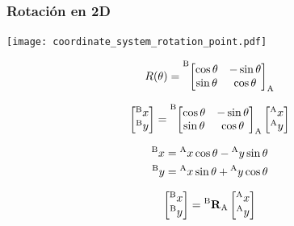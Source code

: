 \begin{frame}
    \frametitle{Rotación en 2D}

    \begin{center}
        \begin{minipage}{0.4\linewidth}
            \texttt{[image: coordinate\_system\_rotation\_point.pdf]}
        \end{minipage}
        \hspace{1em}
        \begin{minipage}{0.5\linewidth}
            \begin{equation*}
                R(\theta) =
                \toCoord{\fromCoord{\begin{bmatrix}
                    \cos \theta & -\sin \theta \\
                    \sin \theta & \cos \theta
                \end{bmatrix}}{A}}{B}
            \end{equation*}

            \begin{equation*}
                \begin{bmatrix}
                    \toCoord{x}{B}\\
                    \toCoord{y}{B}
                \end{bmatrix} =
                \toCoord{\fromCoord{\begin{bmatrix}
                    \cos \theta &-\sin \theta \\
                    \sin \theta &\cos \theta
                \end{bmatrix}}{A}}{B}
                \begin{bmatrix}
                    \toCoord{x}{A}\\
                    \toCoord{y}{A}
                \end{bmatrix}
            \end{equation*}

            \begin{align*}
                \toCoord{x}{B} &= \toCoord{x}{A} \cos \theta -\toCoord{y}{A} \sin \theta\\
                \toCoord{y}{B} &= \toCoord{x}{A} \sin \theta + \toCoord{y}{A}\cos \theta
            \end{align*}

            \begin{equation*}
                \begin{bmatrix}
                    \toCoord{x}{B}\\
                    \toCoord{y}{B}
                \end{bmatrix} =
                \rotationCoord{B}{A}
                \begin{bmatrix}
                    \toCoord{x}{A}\\
                    \toCoord{y}{A}
                \end{bmatrix}
            \end{equation*}
        \end{minipage}
    \end{center}
\end{frame}


